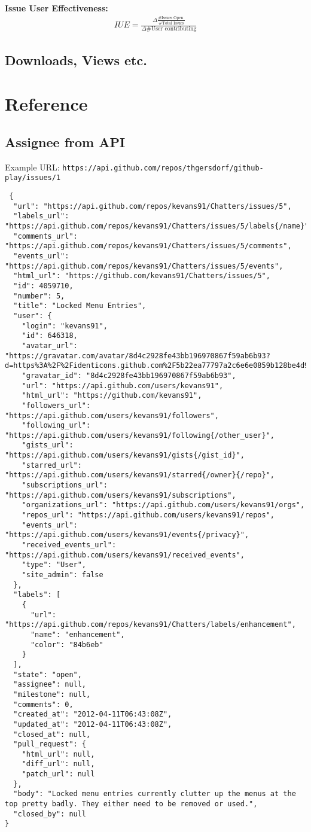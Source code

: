 \documentclass[a4paper,10pt]{article}
\begin{document}
\textbf{Issue User Effectiveness:} 
\begin{align}
 IUE = \frac{\Delta \frac{\text{\# Issues Open }}{\text{\# Total Issues}}}{\Delta\text{\# User contributing}}
\end{align}



\subsection{Downloads, Views etc.}


\section{Reference}
\subsection{Assignee from API}
Example URL: \texttt{https://api.github.com/repos/thgersdorf/github-play/issues/1}

\begin{lstlisting}
 {
  "url": "https://api.github.com/repos/kevans91/Chatters/issues/5",
  "labels_url": "https://api.github.com/repos/kevans91/Chatters/issues/5/labels{/name}",
  "comments_url": "https://api.github.com/repos/kevans91/Chatters/issues/5/comments",
  "events_url": "https://api.github.com/repos/kevans91/Chatters/issues/5/events",
  "html_url": "https://github.com/kevans91/Chatters/issues/5",
  "id": 4059710,
  "number": 5,
  "title": "Locked Menu Entries",
  "user": {
    "login": "kevans91",
    "id": 646318,
    "avatar_url": "https://gravatar.com/avatar/8d4c2928fe43bb196970867f59ab6b93?d=https%3A%2F%2Fidenticons.github.com%2F5b22ea77797a2c6e6e0859b128be4d94.png&r=x",
    "gravatar_id": "8d4c2928fe43bb196970867f59ab6b93",
    "url": "https://api.github.com/users/kevans91",
    "html_url": "https://github.com/kevans91",
    "followers_url": "https://api.github.com/users/kevans91/followers",
    "following_url": "https://api.github.com/users/kevans91/following{/other_user}",
    "gists_url": "https://api.github.com/users/kevans91/gists{/gist_id}",
    "starred_url": "https://api.github.com/users/kevans91/starred{/owner}{/repo}",
    "subscriptions_url": "https://api.github.com/users/kevans91/subscriptions",
    "organizations_url": "https://api.github.com/users/kevans91/orgs",
    "repos_url": "https://api.github.com/users/kevans91/repos",
    "events_url": "https://api.github.com/users/kevans91/events{/privacy}",
    "received_events_url": "https://api.github.com/users/kevans91/received_events",
    "type": "User",
    "site_admin": false
  },
  "labels": [
    {
      "url": "https://api.github.com/repos/kevans91/Chatters/labels/enhancement",
      "name": "enhancement",
      "color": "84b6eb"
    }
  ],
  "state": "open",
  "assignee": null,
  "milestone": null,
  "comments": 0,
  "created_at": "2012-04-11T06:43:08Z",
  "updated_at": "2012-04-11T06:43:08Z",
  "closed_at": null,
  "pull_request": {
    "html_url": null,
    "diff_url": null,
    "patch_url": null
  },
  "body": "Locked menu entries currently clutter up the menus at the top pretty badly. They either need to be removed or used.",
  "closed_by": null
}
\end{lstlisting}
\end{document}
